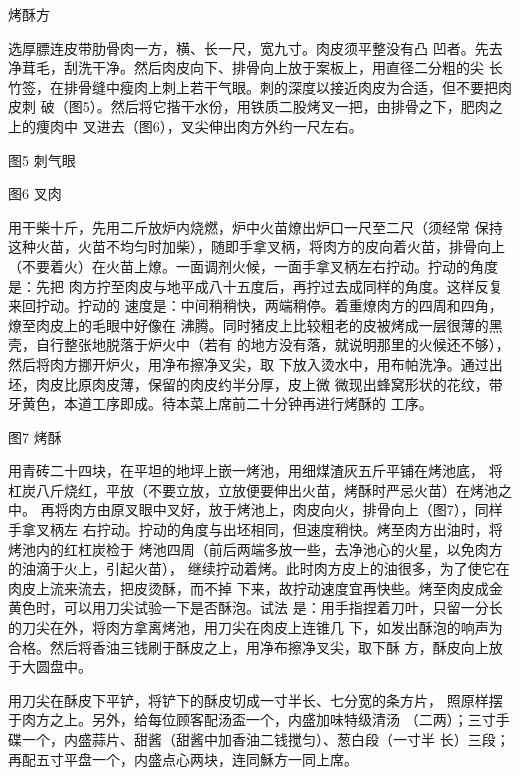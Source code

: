 \begin{recipe}{烤酥方}

\ingredients


\preparation

\step[选料及处理] 选厚膘连皮带肋骨肉一方，横、长一尺，宽九寸。肉皮须平整没有凸
凹者。先去净茸毛，刮洗干净。然后肉皮向下、排骨向上放于案板上，用直径二分粗的尖
长竹签，在排骨缝中瘦肉上刺上若干气眼。刺的深度以接近肉皮为合适，但不要把肉皮刺
破（图5）。然后将它揩干水份，用铁质二股烤叉一把，由排骨之下，肥肉之上的痩肉中
叉进去（图6），叉尖伸出肉方外约一尺左右。

图5 刺气眼

图6 叉肉

\step[出坯] 用干柴十斤，先用二斤放炉内烧燃，炉中火苗燎出炉口一尺至二尺（须经常
保持这种火苗，火苗不均匀时加柴），随即手拿叉柄，将肉方的皮向着火苗，排骨向上
（不要着火）在火苗上燎。一面调剂火候，一面手拿叉柄左右拧动。拧动的角度是：先把
肉方拧至肉皮与地平成八十五度后，再拧过去成同样的角度。这样反复来回拧动。拧动的
速度是：中间稍稍快，两端稍停。着重燎肉方的四周和四角，燎至肉皮上的毛眼中好像在
沸腾。同时猪皮上比较粗老的皮被烤成一层很薄的黑壳，自行整张地脱落于炉火中（若有
的地方没有落，就说明那里的火候还不够），然后将肉方挪开炉火，用净布擦净叉尖，取
下放入烫水中，用布帕洗净。通过出坯，肉皮比原肉皮薄，保留的肉皮约半分厚，皮上微
微现出蜂窝形状的花纹，带牙黄色，本道工序即成。待本菜上席前二十分钟再进行烤酥的
工序。

图7 烤酥

\step[烤酥] 用青砖二十四块，在平坦的地坪上嵌一烤池，用细煤渣灰五斤平铺在烤池底，
将杠炭八斤烧红，平放（不要立放，立放便要伸出火苗，烤酥时严忌火苗）在烤池之中。
再将肉方由原叉眼中叉好，放于烤池上，肉皮向火，排骨向上（图7），同样手拿叉柄左
右拧动。拧动的角度与出坯相同，但速度稍快。烤至肉方出油时，将烤池内的红杠炭检于
烤池四周（前后两端多放一些，去净池心的火星，以免肉方的油滴于火上，引起火苗），
继续拧动着烤。此时肉方皮上的油很多，为了使它在肉皮上流来流去，把皮烫酥，而不掉
下来，故拧动速度宜再快些。烤至肉皮成金黄色时，可以用刀尖试验一下是否酥泡。试法
是：用手指捏着刀叶，只留一分长的刀尖在外，将肉方拿离烤池，用刀尖在肉皮上连锥几
下，如发出酥泡的响声为合格。然后将香油三钱刷于酥皮之上，用净布擦净叉尖，取下酥
方，酥皮向上放于大圆盘中。

\step[铲皮上席] 用刀尖在酥皮下平铲，将铲下的酥皮切成一寸半长、七分宽的条方片，
照原样摆于肉方之上。另外，给每位顾客配汤盃一个，内盛加味特级清汤\footnotemark
（二两）；三寸手碟一个，内盛蒜片、甜酱（甜酱中加香油二钱搅匀）、葱白段（一寸半
长）三段；再配五寸平盘一个，内盛点心两块，连同穌方一同上席。


\end{recipe}
